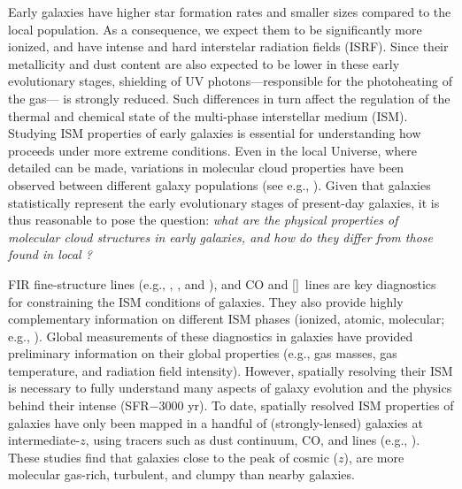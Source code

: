 \IfFileExists{emulateapjlegacy.cls}{\documentclass[iop]{emulateapjlegacy}}{\documentclass[iop]{emulateapj}}
\newcommand{\DL}[1]{({\bf \color{dlcolor} DL: #1})}
\newcommand{\MM}[1]{({\bf \color{mmcolor} MM: #1})}
\begin{document}
Early galaxies have higher star formation rates \citep[SFR; ][]{Behroozi13b, Sparre15a, Maiolino15a, Dunlop17a} and smaller sizes \citep[e.g.,][]{Bouwens11a, Ono13a} compared to the local population.
%
As a consequence, we expect them to be significantly more ionized, and have intense and hard interstelar radiation fields (ISRF). Since their metallicity and dust content are also expected to be lower in these early evolutionary stages, shielding of UV photons---responsible for the photoheating of the gas---  is strongly reduced. Such differences in turn affect the regulation of the thermal and chemical state of the multi-phase interstellar medium (ISM). Studying ISM properties of early galaxies is essential for understanding how \SF proceeds under more extreme conditions.
%
Even in the local Universe, where detailed \obs can be made, variations in molecular cloud
properties have been observed between different galaxy populations (see e.g., \citealt{Hughes10a, Hughes13b}).  Given that \highz galaxies statistically represent the early evolutionary stages of present-day galaxies, it is thus reasonable to pose the question: {\it what are the physical properties of
molecular cloud structures in early galaxies, and how do they differ from those found in local \galpop?}
%

FIR fine-structure lines (e.g., \cii, \nii, and \oiii), and CO and [\ci]~lines are key diagnostics for constraining the ISM conditions of galaxies. They also provide highly complementary information on different ISM phases (ionized, atomic, molecular; e.g., \citealt{Scoville74a, Rubin85a, Malhotra01a}).
%
Global measurements of these diagnostics in \highz galaxies have provided preliminary information on their global properties (e.g., gas masses, gas temperature, and radiation field intensity). However, spatially resolving their ISM is necessary to fully understand many aspects of galaxy evolution and the physics behind their intense \SF (SFR$-$3000\,\Msun\,yr\pmOne).
%
To date, spatially resolved ISM properties of \highz galaxies have only been mapped in a handful of (strongly-lensed) galaxies at intermediate-$z$, using tracers such as dust continuum, CO, and \cii lines (e.g., \citealt{Swinbank11a, Hodge15a, Ferkinhoff15a, Hodge16a, Leung19a}). These studies find that galaxies close to the peak of cosmic \SF ($z$), are more molecular gas-rich, turbulent, and clumpy than nearby galaxies.
\end{document}
